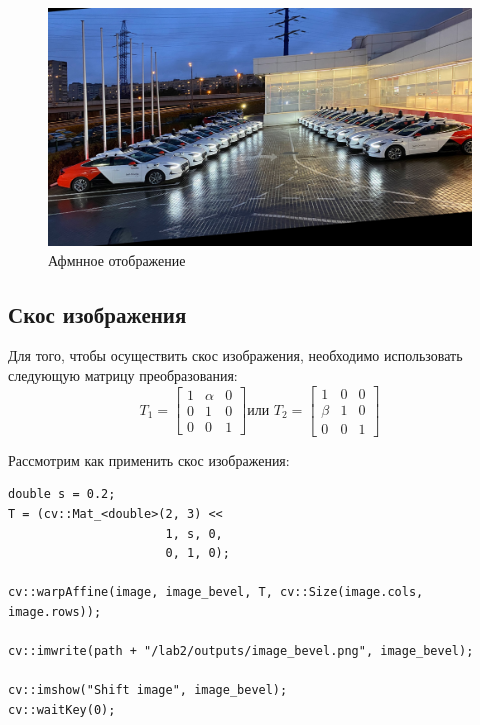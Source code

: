 \begin{figure}[ht]
    \includegraphics[width=\textwidth]{../outputs/image_Affine.png}
    \caption{Афмнное отображение}
    \label{fig:Affine_image}
\end{figure}

\subsection{Скос изображения}

Для того, чтобы осуществить скос изображения, необходимо использовать следующую матрицу преобразования:
\begin{equation}
T_1 = \begin{bmatrix}
    1 & \alpha & 0 \\
    0 & 1 & 0 \\
    0 & 0 & 1
\end{bmatrix} \text{или } 
T_2 = \begin{bmatrix}
    1 & 0 & 0 \\
    \beta & 1 & 0 \\
    0 & 0 & 1
\end{bmatrix}
\end{equation}

Рассмотрим как применить скос изображения:
\begin{lstlisting}[style=cpp_white, caption={Исходный код для скоса изображения}]
double s = 0.2;
T = (cv::Mat_<double>(2, 3) << 
                      1, s, 0, 
                      0, 1, 0); 

cv::warpAffine(image, image_bevel, T, cv::Size(image.cols, image.rows)); 

cv::imwrite(path + "/lab2/outputs/image_bevel.png", image_bevel);

cv::imshow("Shift image", image_bevel); 
cv::waitKey(0);  
\end{lstlisting}

